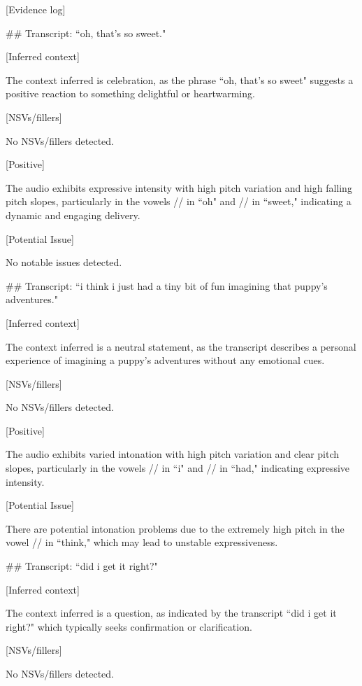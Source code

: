 \begin{tcolorbox}[blue_box, title = {{Audio Sample 1 : Ground-truth Human-likeness Rating = 2.0}}]\footnotesize
[Evidence log]

\#\# Transcript: ``oh, that's so sweet."

[Inferred context]  

The context inferred is celebration, as the phrase ``oh, that's so sweet" suggests a positive reaction to something delightful or heartwarming.


[NSVs/fillers]  

No NSVs/fillers detected.


[Positive]  

The audio exhibits expressive intensity with high pitch variation and high falling pitch slopes, particularly in the vowels // in ``oh" and // in ``sweet," indicating a dynamic and engaging delivery.


[Potential Issue]  

No notable issues detected.


\#\# Transcript: ``i think i just had a tiny bit of fun imagining that puppy's adventures."

[Inferred context]  

The context inferred is a neutral statement, as the transcript describes a personal experience of imagining a puppy's adventures without any emotional cues.  


[NSVs/fillers]  

No NSVs/fillers detected.  


[Positive]  

The audio exhibits varied intonation with high pitch variation and clear pitch slopes, particularly in the vowels // in ``i" and // in ``had," indicating expressive intensity.  


[Potential Issue]  

There are potential intonation problems due to the extremely high pitch in the vowel // in ``think," which may lead to unstable expressiveness.


\#\# Transcript: ``did i get it right?"

[Inferred context]  

The context inferred is a question, as indicated by the transcript ``did i get it right?" which typically seeks confirmation or clarification.


[NSVs/fillers]  

No NSVs/fillers detected.



\end{tcolorbox}

